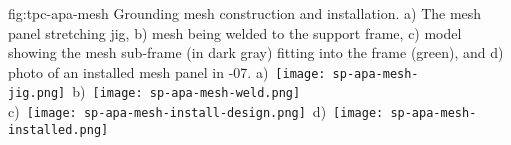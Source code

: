 \begin{dunefigure}{fig:tpc-apa-mesh}
{Grounding mesh construction and installation. a) The mesh panel stretching jig, b) mesh being welded to the support frame, c) model showing the mesh sub-frame (in dark gray) fitting into the  frame (green), and d) photo of an installed mesh panel in -07.}
\mbox{a) \texttt{[image: sp-apa-mesh-jig.png]} \hspace{0.0mm}
b) \texttt{[image: sp-apa-mesh-weld.png]}} \\
\vspace{3mm}
\hspace{0.4mm}
\mbox{c) \texttt{[image: sp-apa-mesh-install-design.png]}
d) \texttt{[image: sp-apa-mesh-installed.png]}}
\end{dunefigure}

\begin{comment}
\begin{dunefigure}[Photos of \dword{apa} grounding mesh application in \dword{pdsp}]{fig:tpc-apa-mesh-application}
{Grounding mesh being clamped to the \dword{apa} and taped off, ready for gluing to a \dword{pdsp} frame.}
\texttt{[image: sp-apa-mesh-application.png]} \quad
\texttt{[image: sp-apa-mesh-applied.jpg]}
\end{dunefigure}
\end{comment}


